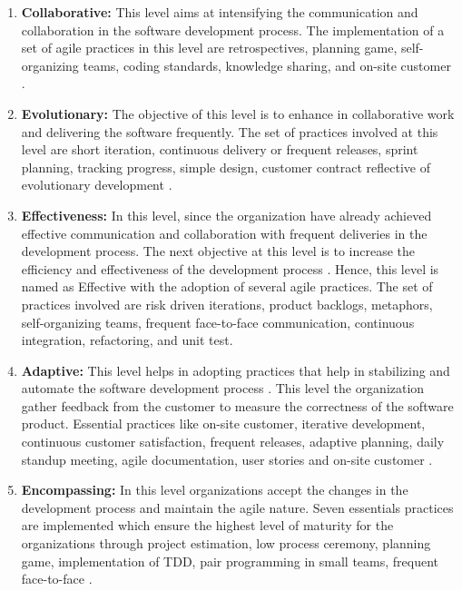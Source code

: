 \documentclass[a4paper,oneside]{bth}
\begin{document}
\begin{enumerate}
\item \textbf{Collaborative:} This level aims at intensifying the communication and collaboration in the software development process. The implementation of a set of agile practices in this level are retrospectives, planning game, self-organizing teams, coding standards, knowledge sharing, and on-site customer \cite{sidky_structured_2007}.
\item \textbf{Evolutionary:} The objective of this level is to enhance in collaborative work and delivering the software frequently. The set of practices involved at this level are short iteration, continuous delivery or frequent releases, sprint planning, tracking progress, simple design, customer contract reflective of evolutionary development \cite{sidky_structured_2007}.
\item \textbf{Effectiveness:} In this level, since the organization have already achieved effective communication and collaboration with frequent deliveries in the development process. The next objective at this level is to increase the efficiency and effectiveness of the development process \cite{sidky_structured_2007}. Hence, this level is named as Effective with the adoption of several agile practices. The set of practices involved are risk driven iterations, product backlogs, metaphors, self-organizing teams, frequent face-to-face communication, continuous integration, refactoring, and unit test.
\item \textbf{Adaptive:} This level helps in adopting practices that help in stabilizing and automate the software development process \cite{sidky_structured_2007}. This level the organization gather feedback from the customer to measure the correctness of the software product. Essential practices like on-site customer, iterative development, continuous customer satisfaction, frequent releases, adaptive planning, daily standup meeting, agile documentation, user stories and on-site customer \cite{sidky_structured_2007}.
\item \textbf{Encompassing:} In this level organizations accept the changes in the development process and maintain the agile nature. Seven essentials practices are implemented which ensure the highest level of maturity for the organizations through project estimation, low process ceremony, planning game, implementation of TDD, pair programming in small teams, frequent face-to-face \cite{sidky_structured_2007}.
\end{enumerate}
\end{document}
